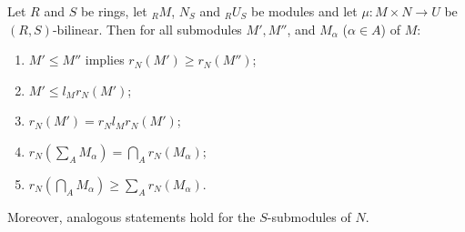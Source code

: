 Let $R$ and $S$ be rings, let ${}_R M$, $N_S$ and ${}_R U_S$ be modules and let $\mu: M \times N \to U$ be $(R, S)$-bilinear. Then for all submodules $M', M''$, and $M_\alpha$ ($\alpha \in A$) of $M$:

\begin{enumerate}
\item[(1)] $M' \leq M''$ implies $r_N(M') \geq r_N(M'')$;
\item[(2)] $M' \leq l_M r_N(M')$;
\item[(3)] $r_N(M') = r_N l_M r_N(M')$;
\item[(4)] $r_N(\sum_A M_\alpha) = \bigcap_A r_N(M_\alpha)$;
\item[(5)] $r_N(\bigcap_A M_\alpha) \geq \sum_A r_N(M_\alpha)$.
\end{enumerate}

Moreover, analogous statements hold for the $S$-submodules of $N$.

